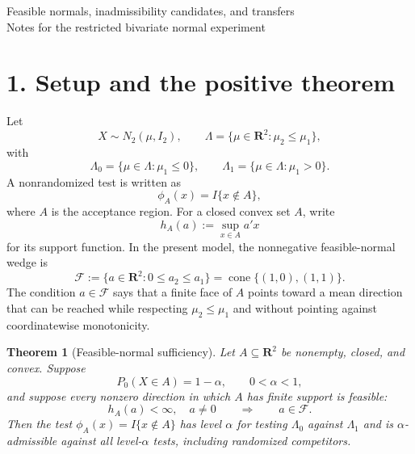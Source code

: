 \documentclass[12pt]{article}
\newtheorem{theorem}{Theorem}
\theoremstyle{remark}
\begin{document}
\begin{center}
{\Large Feasible normals, inadmissibility candidates, and transfers}\\[3pt]
{\small Notes for the restricted bivariate normal experiment}
\end{center}

\section*{1. Setup and the positive theorem}

Let
\[
X\sim N_2(\mu,I_2),
\qquad
\Lambda=\{\mu\in\mathbf R^2:\mu_2\le\mu_1\},
\]
with
\[
\Lambda_0=\{\mu\in\Lambda:\mu_1\le0\},
\qquad
\Lambda_1=\{\mu\in\Lambda:\mu_1>0\}.
\]
A nonrandomized test is written as
\[
\phi_A(x)=I\{x\notin A\},
\]
where $A$ is the acceptance region. For a closed convex set $A$, write
\[
h_A(a):=\sup_{x\in A}a'x
\]
for its support function. In the present model, the nonnegative feasible-normal wedge is
\[
\mathcal F
:=\{a\in\mathbf R^2:0\le a_2\le a_1\}
=\operatorname{cone}\{(1,0),(1,1)\}.
\]
The condition $a\in\mathcal F$ says that a finite face of $A$ points toward a mean direction that can be reached while respecting $\mu_2\le\mu_1$ and without pointing against coordinatewise monotonicity.

\begin{theorem}[Feasible-normal sufficiency]\label{thm:feasible-normal-sufficiency}
Let $A\subseteq\mathbf R^2$ be nonempty, closed, and convex. Suppose
\[
P_0(X\in A)=1-\alpha,
\qquad 0<\alpha<1,
\]
and suppose every nonzero direction in which $A$ has finite support is feasible:
\[
h_A(a)<\infty,
\quad a\ne0
\qquad\Longrightarrow\qquad
 a\in\mathcal F.
\]
Then the test $\phi_A(x)=I\{x\notin A\}$ has level $\alpha$ for testing $\Lambda_0$ against $\Lambda_1$ and is $\alpha$-admissible against all level-$\alpha$ tests, including randomized competitors.
\end{theorem}
\end{document}
